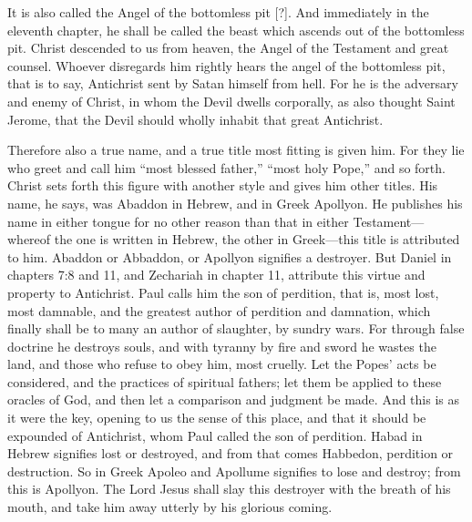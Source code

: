 It is also called the Angel of the bottomless pit [?]. And immediately in the eleventh chapter, he shall be called the beast which ascends out of the bottomless pit. Christ descended to us from heaven, the Angel of the Testament and great counsel. Whoever disregards him rightly hears the angel of the bottomless pit, that is to say, Antichrist sent by Satan himself from hell. For he is the adversary and enemy of Christ, in whom the Devil dwells corporally, as also thought Saint Jerome, that the Devil should wholly inhabit that great Antichrist.

Therefore also a true name, and a true title most fitting is given him. For they lie who greet and call him “most blessed father,” “most holy Pope,” and so forth. Christ sets forth this figure with another style and gives him other titles. His name, he says, was Abaddon in Hebrew, and in Greek Apollyon. He publishes his name in either tongue for no other reason than that in either Testament—whereof the one is written in Hebrew, the other in Greek—this title is attributed to him. Abaddon or Abbaddon, or Apollyon signifies a destroyer. But Daniel in chapters 7:8 and 11, and Zechariah in chapter 11, attribute this virtue and property to Antichrist. Paul calls him the son of perdition, that is, most lost, most damnable, and the greatest author of perdition and damnation, which finally shall be to many an author of slaughter, by sundry wars. For through false doctrine he destroys souls, and with tyranny by fire and sword he wastes the land, and those who refuse to obey him, most cruelly. Let the Popes’ acts be considered, and the practices of spiritual fathers; let them be applied to these oracles of God, and then let a comparison and judgment be made. And this is as it were the key, opening to us the sense of this place, and that it should be expounded of Antichrist, whom Paul called the son of perdition. Habad in Hebrew signifies lost or destroyed, and from that comes Habbedon, perdition or destruction. So in Greek Apoleo and Apollume signifies to lose and destroy; from this is Apollyon. The Lord Jesus shall slay this destroyer with the breath of his mouth, and take him away utterly by his glorious coming.
